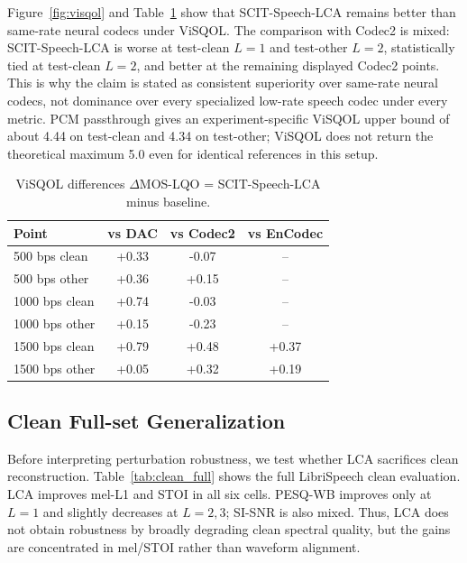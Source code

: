 ﻿\documentclass[conference]{IEEEtran}
\newcommand{\lca}{SCIT-Speech-LCA}
\begin{document}
Figure~\ref{fig:visqol} and Table~\ref{tab:visqol} show that \lca{} remains better than same-rate neural codecs under ViSQOL. The comparison with Codec2 is mixed: \lca{} is worse at test-clean \(L=1\) and test-other \(L=2\), statistically tied at test-clean \(L=2\), and better at the remaining displayed Codec2 points. This is why the claim is stated as consistent superiority over same-rate neural codecs, not dominance over every specialized low-rate speech codec under every metric. PCM passthrough gives an experiment-specific ViSQOL upper bound of about 4.44 on test-clean and 4.34 on test-other; ViSQOL does not return the theoretical maximum 5.0 even for identical references in this setup.

\begin{table}[t]
\centering
\caption{ViSQOL differences \(\Delta\)MOS-LQO = \lca{} minus baseline.}
\label{tab:visqol}
\small
\begin{tabular}{lccc}
\toprule
Point & vs DAC & vs Codec2 & vs EnCodec \\
\midrule
500 bps clean & +0.33 & -0.07 & -- \\
500 bps other & +0.36 & +0.15 & -- \\
1000 bps clean & +0.74 & -0.03 & -- \\
1000 bps other & +0.15 & -0.23 & -- \\
1500 bps clean & +0.79 & +0.48 & +0.37 \\
1500 bps other & +0.05 & +0.32 & +0.19 \\
\bottomrule
\end{tabular}
\end{table}

\subsection{Clean Full-set Generalization}

Before interpreting perturbation robustness, we test whether LCA sacrifices clean reconstruction. Table~\ref{tab:clean_full} shows the full LibriSpeech clean evaluation. LCA improves mel-L1 and STOI in all six cells. PESQ-WB improves only at \(L=1\) and slightly decreases at \(L=2,3\); SI-SNR is also mixed. Thus, LCA does not obtain robustness by broadly degrading clean spectral quality, but the gains are concentrated in mel/STOI rather than waveform alignment.
\end{document}
